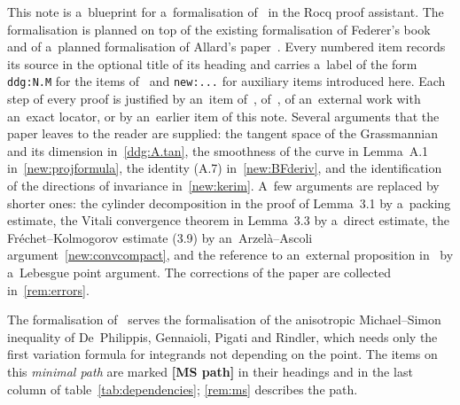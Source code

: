 \documentclass[a4paper,twoside,leqno]{article}
\newcommand{\MS}{\textbf{[MS path]}}            %
\begin{document}
This note is a~blueprint for a~formalisation of~\cite{DePhilippis2018} in the Rocq proof
assistant. The formalisation is planned on top of the existing formalisation of Federer's
book~\cite{Federer1969} and of a~planned formalisation of Allard's paper~\cite{Allard1972}. Every
numbered item records its source in the optional title of its heading and carries a~label of the
form \texttt{ddg:N.M} for the items of~\cite{DePhilippis2018} and \texttt{new:...} for auxiliary
items introduced here. Each step of every proof is justified by an~item of~\cite{Federer1969},
of~\cite{Allard1972}, of an~external work with an~exact locator, or by an~earlier item of this
note. Several arguments that the paper leaves to the reader are supplied: the tangent space of the
Grassmannian and its dimension in~\ref{ddg:A.tan}, the smoothness of the curve in Lemma~A.1
in~\ref{new:projformula}, the identity (A.7) in~\ref{new:BFderiv}, and the identification of the
directions of invariance in~\ref{new:kerim}. A~few arguments are replaced by shorter ones: the
cylinder decomposition in the proof of Lemma~3.1 by a~packing estimate, the Vitali convergence
theorem in Lemma~3.3 by a~direct estimate, the Fr\'echet--Kolmogorov estimate (3.9) by an~Arzel\`a--Ascoli
argument~\ref{new:convcompact}, and the reference to an~external proposition in~\cite[Lemma~2.3]{DePhilippis2018} by
a~Lebesgue point argument. The corrections of the paper are collected in~\ref{rem:errors}.

The formalisation of~\cite{DePhilippis2018} serves the formalisation of the anisotropic
Michael--Simon inequality of De~Philippis, Gennaioli, Pigati and Rindler, which needs only the
first variation formula for integrands not depending on the point. The items on this
\emph{minimal path} are marked \MS{} in their headings and in the last column of
table~\ref{tab:dependencies}; \ref{rem:ms} describes the path.
\end{document}
